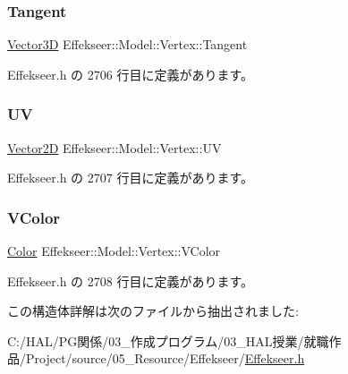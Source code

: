 \subsubsection{\texorpdfstring{Tangent}{Tangent}}
{\footnotesize\ttfamily \mbox{\hyperlink{struct_effekseer_1_1_vector3_d}{Vector3D}} Effekseer\+::\+Model\+::\+Vertex\+::\+Tangent}



 Effekseer.\+h の 2706 行目に定義があります。

\mbox{\label{struct_effekseer_1_1_model_1_1_vertex_a4b16f6ed12f2a67a6064728c7fe37d7f}} 
\subsubsection{\texorpdfstring{UV}{UV}}
{\footnotesize\ttfamily \mbox{\hyperlink{struct_effekseer_1_1_vector2_d}{Vector2D}} Effekseer\+::\+Model\+::\+Vertex\+::\+UV}



 Effekseer.\+h の 2707 行目に定義があります。

\mbox{\label{struct_effekseer_1_1_model_1_1_vertex_a41a843c2f7d16433de79a01837a91a7f}} 
\subsubsection{\texorpdfstring{V\+Color}{VColor}}
{\footnotesize\ttfamily \mbox{\hyperlink{struct_effekseer_1_1_color}{Color}} Effekseer\+::\+Model\+::\+Vertex\+::\+V\+Color}



 Effekseer.\+h の 2708 行目に定義があります。



この構造体詳解は次のファイルから抽出されました\+:\begin{DoxyCompactItemize}
\item 
C\+:/\+H\+A\+L/\+P\+G関係/03\+\_\+作成プログラム/03\+\_\+\+H\+A\+L授業/就職作品/\+Project/source/05\+\_\+\+Resource/\+Effekseer/\mbox{\hyperlink{_effekseer_8h}{Effekseer.\+h}}\end{DoxyCompactItemize}
